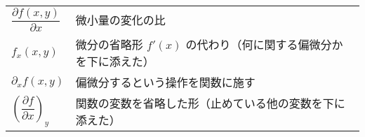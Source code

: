 \documentclass[../../../topic_calculus]{subfiles}
\begin{document}
\br

\begin{table}[h]
\renewcommand{\arraystretch}{1.5} %
\centering
\begin{tabular}{ll}
$\dfrac{\partial f(x,y)}{\partial x}$ & 微小量の変化の比 \\ 
$f_x(x,y)$ & 微分の省略形 $f'(x)$ の代わり（何に関する偏微分かを下に添えた） \\
$\partial_x f(x,y)$ & 偏微分するという操作を関数に施す \\
$\left(\dfrac{\partial f }{\partial x}\right)_y$ & 関数の変数を省略した形（止めている他の変数を下に添えた） \\
\end{tabular}
\end{table}
\end{document}
